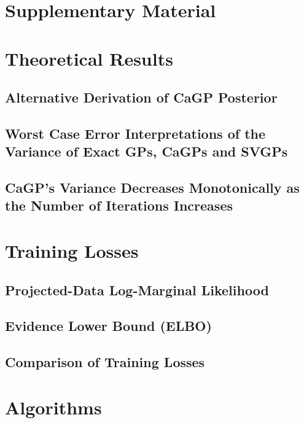\beginsupplementary
\startcontents[supplementary]

\section*{Supplementary Material}


	{\small
		\vspace{2em}
		\vspace{2em}
	}


    \section{Theoretical Results}

    \subsection{Alternative Derivation of CaGP Posterior}
    
   
    \subsection{Worst Case Error Interpretations of the Variance of Exact GPs, CaGPs and SVGPs}
    \subsection{CaGP's Variance Decreases Monotonically as the Number of Iterations Increases}
\section{Training Losses}

\subsection{Projected-Data Log-Marginal Likelihood}

\subsection{Evidence Lower Bound (ELBO)}
\newpage
\subsection{Comparison of Training Losses}



\section{Algorithms}

